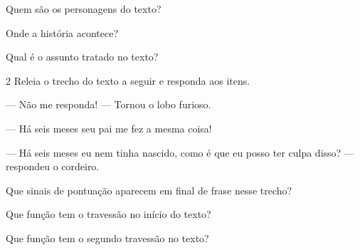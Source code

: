 \begin{escolha}[itemsep=-5pt]
\item Quem são os personagens do texto?

\item Onde a história acontece?

\item Qual é o assunto tratado no texto?
\end{escolha}

\num{2} Releia o trecho do texto a seguir e responda aos itens.

\begin{myquote}
\textit{ }

--- Não me responda! --- Tornou o lobo furioso.

--- Há seis meses seu pai me fez a mesma coisa!

--- Há seis meses eu nem tinha nascido, como é que eu posso ter culpa disso? --- respondeu o cordeiro.
\end{myquote}

\begin{escolha}[itemsep=-5pt]
\item Que sinais de pontuação aparecem em final de frase nesse trecho?


\item Que função tem o travessão no início do texto?

\item Que função tem o segundo travessão no texto?
\end{escolha}


